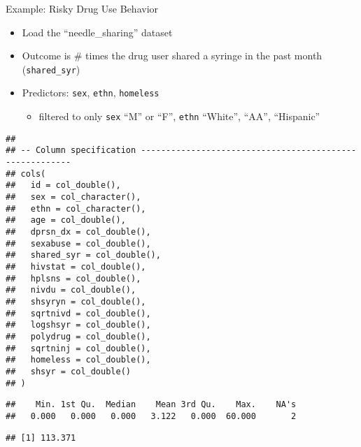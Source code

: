 \documentclass[
  ignorenonframetext,
]{beamer}
\newenvironment{Shaded}{\begin{snugshade}}{\end{snugshade}}
\newcommand{\DataTypeTok}[1]{\textcolor[rgb]{0.13,0.29,0.53}{#1}}
\newcommand{\KeywordTok}[1]{\textcolor[rgb]{0.13,0.29,0.53}{\textbf{#1}}}
\newcommand{\NormalTok}[1]{#1}
\newcommand{\OperatorTok}[1]{\textcolor[rgb]{0.81,0.36,0.00}{\textbf{#1}}}
\newcommand{\OtherTok}[1]{\textcolor[rgb]{0.56,0.35,0.01}{#1}}
\providecommand{\tightlist}{%
  \setlength{\itemsep}{0pt}\setlength{\parskip}{0pt}}
\begin{document}
\begin{frame}[fragile]{Example: Risky Drug Use Behavior}
\protect\hypertarget{example-risky-drug-use-behavior}{}

\begin{itemize}
\tightlist
\item
  Load the ``needle\_sharing'' dataset
\item
  Outcome is \# times the drug user shared a syringe in the past month
  (\texttt{shared\_syr})
\item
  Predictors: \texttt{sex}, \texttt{ethn}, \texttt{homeless}

  \begin{itemize}
  \tightlist
  \item
    filtered to only \texttt{sex} ``M'' or ``F'', \texttt{ethn}
    ``White'', ``AA'', ``Hispanic''
  \end{itemize}
\end{itemize}

\small

\begin{verbatim}
## 
## -- Column specification --------------------------------------------------------
## cols(
##   id = col_double(),
##   sex = col_character(),
##   ethn = col_character(),
##   age = col_double(),
##   dprsn_dx = col_double(),
##   sexabuse = col_double(),
##   shared_syr = col_double(),
##   hivstat = col_double(),
##   hplsns = col_double(),
##   nivdu = col_double(),
##   shsyryn = col_double(),
##   sqrtnivd = col_double(),
##   logshsyr = col_double(),
##   polydrug = col_double(),
##   sqrtninj = col_double(),
##   homeless = col_double(),
##   shsyr = col_double()
## )
\end{verbatim}

\begin{Shaded}
\end{Shaded}

\begin{verbatim}
##    Min. 1st Qu.  Median    Mean 3rd Qu.    Max.    NA's 
##   0.000   0.000   0.000   3.122   0.000  60.000       2
\end{verbatim}

\begin{Shaded}
\end{Shaded}

\begin{verbatim}
## [1] 113.371
\end{verbatim}

\end{frame}
\end{document}
